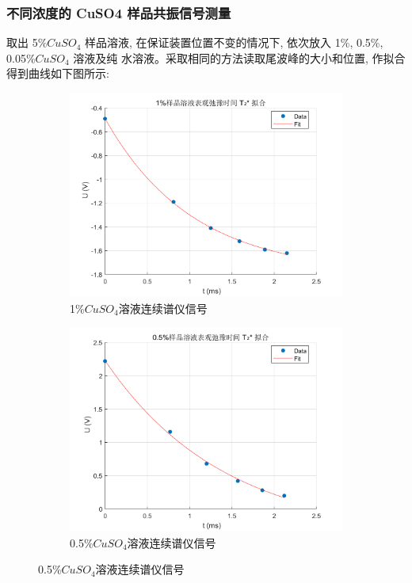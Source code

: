 \documentclass[12pt,a4paper]{article}
\begin{document}
\subsubsection{不同浓度的 CuSO4 样品共振信号测量}
取出 5\%$CuS O_4$ 样品溶液, 在保证装置位置不变的情况下, 依次放入 1\%, 0.5\%, 0.05\%$CuS O_4$ 溶液及纯
水溶液。采取相同的方法读取尾波峰的大小和位置, 作拟合得到曲线如下图所示:

\begin{figure}[ht]
\centering
\begin{subfigure}[b]{0.45\textwidth}
    \includegraphics[width=\textwidth]{1弛豫时间拟合.png}
    \caption{1\%$CuSO_4$溶液连续谱仪信号}
\end{subfigure}
\hfill
\begin{subfigure}[b]{0.45\textwidth}
    \includegraphics[width=\textwidth]{05弛豫时间拟合.png}
    \caption{0.5\%$CuSO_4$溶液连续谱仪信号}
\end{subfigure}


\end{figure}
\end{document}
